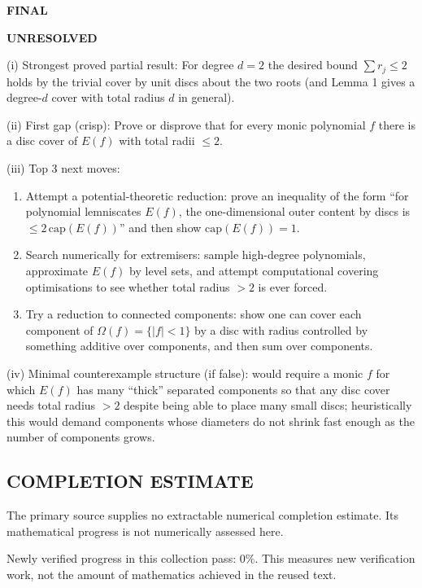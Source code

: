 \medskip
\noindent\textbf{FINAL}

\textbf{UNRESOLVED}

(i) Strongest proved partial result: For degree $d=2$ the desired bound $\sum r_j\le 2$ holds by the trivial cover by unit discs about the two roots (and Lemma 1 gives a degree-$d$ cover with total radius $d$ in general).

(ii) First gap (crisp): Prove or disprove that for every monic polynomial $f$ there is a disc cover of $E(f)$ with total radii $\le 2$.

(iii) Top 3 next moves:
\begin{enumerate}
\item Attempt a potential-theoretic reduction: prove an inequality of the form ``for polynomial lemniscates $E(f)$, the one-dimensional outer content by discs is $\le 2\,\mathrm{cap}(E(f))$'' and then show $\mathrm{cap}(E(f))=1$.
\item Search numerically for extremisers: sample high-degree polynomials, approximate $E(f)$ by level sets, and attempt computational covering optimisations to see whether total radius $>2$ is ever forced.
\item Try a reduction to connected components: show one can cover each component of $\Omega(f)=\{|f|<1\}$ by a disc with radius controlled by something additive over components, and then sum over components.
\end{enumerate}

(iv) Minimal counterexample structure (if false): would require a monic $f$ for which $E(f)$ has many ``thick'' separated components so that any disc cover needs total radius $>2$ despite being able to place many small discs; heuristically this would demand components whose diameters do not shrink fast enough as the number of components grows.




\subsection*{COMPLETION ESTIMATE}
The primary source supplies no extractable numerical completion estimate. Its mathematical progress is not numerically assessed here.

Newly verified progress in this collection pass: $0\%$. This measures new verification work, not the amount of mathematics achieved in the reused text.
